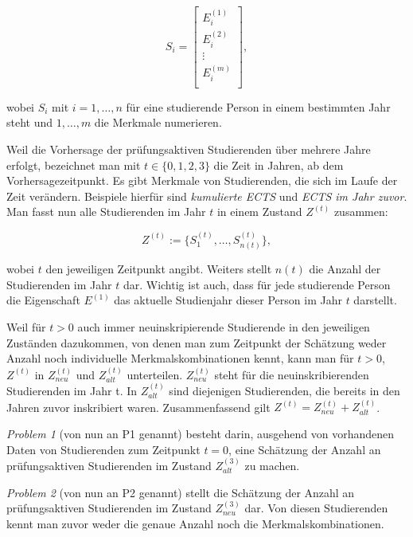 $$S_i = \begin{bmatrix}
		E_i^{(1)} \\
		E_i^{(2)} \\
		\vdots    \\
		E_i^{(m)} \\
	\end{bmatrix}, $$

wobei $S_i$ mit $i = 1,\dots,n$ f\"ur eine studierende Person in einem bestimmten Jahr steht und $1,\dots,m$ die Merkmale numerieren.

Weil die Vorhersage der pr\"ufungsaktiven Studierenden \"uber mehrere Jahre erfolgt, bezeichnet man
mit $t \in \{0,1,2,3\}$ die Zeit in Jahren, ab dem Vorhersagezeitpunkt. Es gibt Merkmale von Studierenden, die sich im Laufe der Zeit
ver\"andern. Beispiele hierf\"ur sind \textit{\glqq kumulierte ECTS\grqq{}} und \textit{\glqq ECTS im Jahr zuvor\grqq{}}. Man fasst nun alle
Studierenden im Jahr $t$ in einem Zustand $Z^{(t)}$ zusammen:

$$Z^{(t)} := \{S_1^{(t)}, \dots ,S_{n(t)}^{(t)}\},$$

wobei $t$ den jeweiligen Zeitpunkt angibt. Weiters stellt $n(t)$ die Anzahl der Studierenden im
Jahr $t$ dar. Wichtig ist auch, dass f\"ur jede studierende Person die Eigenschaft $E^{(1)}$ das aktuelle Studienjahr
dieser Person im Jahr $t$ darstellt.



Weil für $t>0$ auch immer neuinskripierende Studierende in den jeweiligen Zuständen dazukommen, von denen man zum Zeitpunkt der Sch\"atzung weder
Anzahl noch individuelle Merkmalskombinationen kennt, kann man für $t>0$, $Z^{(t)}$ in $Z_{neu}^{(t)}$ und $Z_{alt}^{(t)}$ unterteilen.
$Z_{neu}^{(t)}$ steht f\"ur die neuinskribierenden Studierenden im Jahr t.
In $Z_{alt}^{(t)}$ sind diejenigen Studierenden, die bereits in den Jahren zuvor inskribiert waren.
Zusammenfassend gilt $Z^{(t)} = Z_{neu}^{(t)} + Z_{alt}^{(t)}$.

\textit{Problem 1} (von nun an P1 genannt) besteht darin, ausgehend von vorhandenen Daten von Studierenden zum Zeitpunkt $t = 0$,
eine Sch\"atzung der Anzahl an pr\"ufungsaktiven Studierenden im Zustand $Z_{alt}^{(3)}$ zu machen.

\textit{Problem 2} (von nun an P2 genannt) stellt die Sch\"atzung der Anzahl an pr\"ufungsaktiven Studierenden im Zustand $Z_{neu}^{(3)}$ dar. Von diesen
Studierenden kennt man zuvor weder die genaue Anzahl noch die Merkmalskombinationen.


